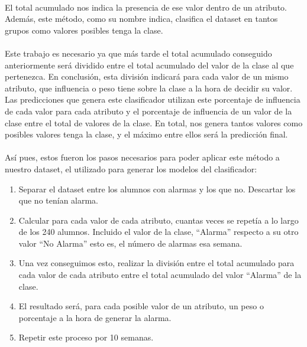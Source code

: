  \paragraph{}
El total acumulado nos indica la presencia de ese valor dentro de un atributo. Además, este método, como su nombre indica, clasifica el dataset en tantos grupos como valores posibles tenga la clase.
 \paragraph{}
Este trabajo es necesario ya que más tarde el total acumulado conseguido anteriormente será dividido entre el total acumulado del valor de la clase al que pertenezca. En conclusión, esta división indicará para cada valor de un mismo atributo, que influencia o peso tiene sobre la clase a la hora de decidir su valor. Las predicciones que genera este clasificador utilizan este porcentaje de influencia de cada valor para cada atributo y el porcentaje de influencia de un valor de la clase entre el total de valores de la clase. En total, nos genera tantos valores como posibles valores tenga la clase, y el máximo entre ellos será la predicción final.


\paragraph{}
Así pues, estos fueron los pasos necesarios para poder aplicar este
método a nuestro dataset, el utilizado para generar los modelos del
clasificador:
\begin{enumerate}
\item Separar el dataset entre los alumnos con alarmas y los que
  no. Descartar los que no tenían alarma.
\item Calcular para cada valor de cada atributo, cuantas veces se
  repetía a lo largo de los 240 alumnos. Incluido el valor de la
  clase, “Alarma” respecto a su otro valor “No Alarma” esto es, el
  número de alarmas esa semana.
\item Una vez conseguimos esto, realizar la división entre el total
  acumulado para cada valor de cada atributo entre el total acumulado
  del valor “Alarma” de la clase.
\item El resultado será, para cada posible valor de un atributo, un
  peso o porcentaje a la hora de generar la alarma.
\item Repetir este proceso por 10 semanas.
\end{enumerate}

